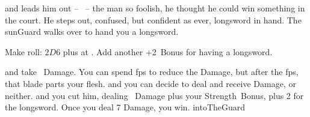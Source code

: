 and  leads him out -- \composeHumanName\ -- the man so foolish, he thought he could win something in the \gls{court}.
He steps out, confused, but confident as ever, longsword in hand.
The \gls{sunGuard} walks over to hand you a longsword.

Make  roll: $2D6$ plus  at \tn[11].
Add another +2~Bonus for having a longsword.

\begin{selectPath}
  {and take ~Damage.
  You can spend \glspl{fp} to reduce the Damage, but after the \glspl{fp}, that blade parts your flesh.}%
  {}
  {and you can decide to deal and receive Damage, or neither.}%
  {}
  {and you cut him, dealing ~Damage plus your Strength~Bonus, plus 2 for the longsword.
  Once you deal 7 Damage, you win.}%
  {intoTheGuard}
\end{selectPath}

